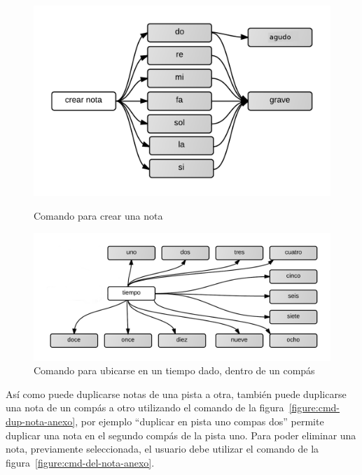  \begin{figure}[H]
\begin{minipage}[b]{0.5\linewidth}
\centering
\includegraphics[width=1\linewidth]{./graphics/cmd-crear-nota.png}
\caption{Comando para crear una nota}
\label{figure:cmd-crear-nota-anexo}
\end{minipage}
\quad
\begin{minipage}[b]{0.5\linewidth}
\centering
\includegraphics[width=1.1\linewidth]{./graphics/cmd-tiempo-compas.png}
\caption{Comando para ubicarse en un tiempo dado, dentro de un comp\'as}
\label{figure:cmd-tiempo-compas-anexo}
\end{minipage}
\end{figure}

As\'i como puede duplicarse notas de una pista a otra, tambi\'en puede duplicarse una nota de un comp\'as a otro utilizando el comando
de la figura~\ref{figure:cmd-dup-nota-anexo}, por ejemplo ``duplicar en pista uno compas dos'' permite duplicar una nota en el segundo comp\'as de la pista 
uno. Para poder eliminar una nota, previamente seleccionada, el usuario debe utilizar el comando
de la figura~\ref{figure:cmd-del-nota-anexo}.

